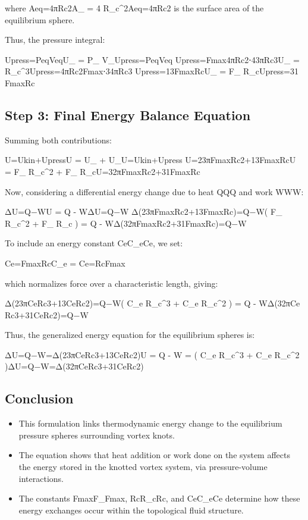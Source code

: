 {where Aeq=4πRc2A_{} = 4 \pi R_c^2Aeq​=4πRc2​ is the surface area of the equilibrium sphere.

Thus, the pressure integral:

Upress=PeqVeqU_{} = P_{} V_{}Upress​=Peq​Veq​ Upress=Fmax⁡4πRc2⋅43πRc3U_{} =  \cdot {} \pi R_c^3Upress​=4πRc2​Fmax​​⋅34​πRc3​ Upress=13Fmax⁡RcU_{} =  F_{\max} R_cUpress​=31​Fmax​Rc​



\subsection*{Step 3: Final Energy Balance Equation}
Summing both contributions:

U=Ukin+UpressU = U_{} + U_{}U=Ukin​+Upress​ U=23πFmax⁡Rc2+13Fmax⁡RcU =  \pi F_{\max} R_c^2 +  F_{\max} R_cU=32​πFmax​Rc2​+31​Fmax​Rc​

Now, considering a differential energy change due to heat QQQ and work WWW:

ΔU=Q−W\Delta U = Q - WΔU=Q−W Δ(23πFmax⁡Rc2+13Fmax⁡Rc)=Q−W\Delta \left(  \pi F_{\max} R_c^2 +  F_{\max} R_c \right) = Q - WΔ(32​πFmax​Rc2​+31​Fmax​Rc​)=Q−W

To include an energy constant CeC_eCe​, we set:

Ce=Fmax⁡RcC_e = Ce​=Rc​Fmax​​

which normalizes force over a characteristic length, giving:

Δ(23πCeRc3+13CeRc2)=Q−W\Delta \left(  \pi C_e R_c^3 +  C_e R_c^2 \right) = Q - WΔ(32​πCe​Rc3​+31​Ce​Rc2​)=Q−W

Thus, the generalized energy equation for the equilibrium spheres is:

ΔU=Q−W=Δ(23πCeRc3+13CeRc2)\Delta U = Q - W = \Delta \left(  \pi C_e R_c^3 +  C_e R_c^2 \right)ΔU=Q−W=Δ(32​πCe​Rc3​+31​Ce​Rc2​)



\subsection*{Conclusion}
\begin{itemize}
\item This formulation links thermodynamic energy change to the equilibrium pressure spheres surrounding vortex knots.


\item The equation shows that heat addition or work done on the system affects the energy stored in the knotted vortex system, via pressure-volume interactions.


\item The constants Fmax⁡F_{\max}Fmax​, RcR_cRc​, and CeC_eCe​ determine how these energy exchanges occur within the topological fluid structure.


\end{itemize}

}
